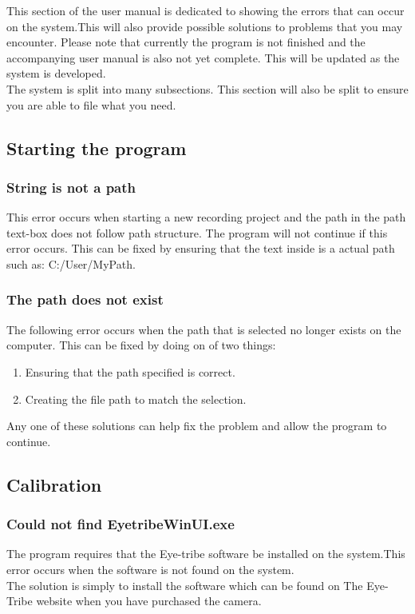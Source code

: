 This section of the user manual is dedicated to showing the errors that can occur on the system.This will also provide possible solutions to problems that you may encounter. Please note that currently the program is not finished and the accompanying user manual is also not yet complete. This will be updated as the system is developed.\\

The system is split into many subsections. This section will also be split to ensure you are able to file what you need.

\subsection{Starting the program}
\subsubsection{String is not a path}
This error occurs when starting a new recording project and the path in the path text-box does not follow path structure. The program will not continue if this error occurs.
This can be fixed by ensuring that the text inside is a actual path such as: C:/User/MyPath.
\subsubsection{The path does not exist}
The following error occurs when the path that is selected no longer exists on the computer. This can be fixed by doing on of two things:\\
\begin{enumerate}
\item Ensuring that the path specified is correct.
\item Creating the file path to match the selection. 
\end{enumerate}
Any one of these solutions can help fix the problem and allow the program to continue.
\subsection{Calibration}
\subsubsection{Could not find EyetribeWinUI.exe}
The program requires that the Eye-tribe software be installed on the system.This error occurs when the software is not found on the system.\\
The solution is simply to install the software which can be found on The Eye-Tribe website when you have purchased the camera.

